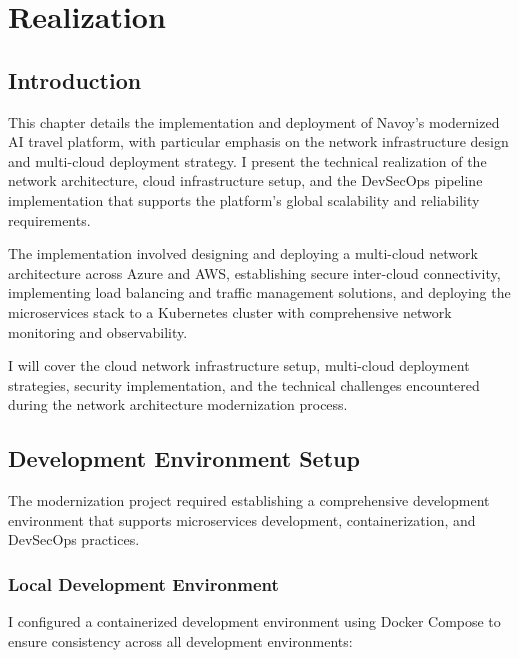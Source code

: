 \chapter{Realization}
\minitoc
\newpage

\setcounter{secnumdepth}{0} %
\section{Introduction}
This chapter details the implementation and deployment of Navoy's modernized AI travel platform, with particular emphasis on the network infrastructure design and multi-cloud deployment strategy. I present the technical realization of the network architecture, cloud infrastructure setup, and the DevSecOps pipeline implementation that supports the platform's global scalability and reliability requirements.

The implementation involved designing and deploying a multi-cloud network architecture across Azure and AWS, establishing secure inter-cloud connectivity, implementing load balancing and traffic management solutions, and deploying the microservices stack to a Kubernetes cluster with comprehensive network monitoring and observability.

I will cover the cloud network infrastructure setup, multi-cloud deployment strategies, security implementation, and the technical challenges encountered during the network architecture modernization process.

\setcounter{secnumdepth}{2} %
\section{Development Environment Setup}
The modernization project required establishing a comprehensive development environment that supports microservices development, containerization, and DevSecOps practices.

\subsection{Local Development Environment}
I configured a containerized development environment using Docker Compose to ensure consistency across all development environments:

